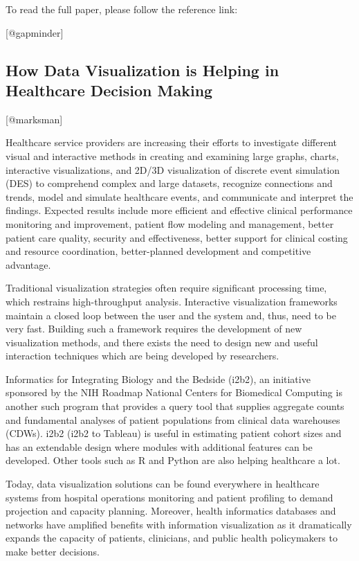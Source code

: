 \documentclass[]{book}
\theoremstyle{definition}
\theoremstyle{definition}
\theoremstyle{definition}
\theoremstyle{remark}
\begin{document}
To read the full paper, please follow the reference link:

{[}@gapminder{]}

\subsection{How Data Visualization is Helping in Healthcare Decision
Making}\label{how-data-visualization-is-helping-in-healthcare-decision-making}

{[}@marksman{]}

Healthcare service providers are increasing their efforts to investigate
different visual and interactive methods in creating and examining large
graphs, charts, interactive visualizations, and 2D/3D visualization of
discrete event simulation (DES) to comprehend complex and large
datasets, recognize connections and trends, model and simulate
healthcare events, and communicate and interpret the findings. Expected
results include more efficient and effective clinical performance
monitoring and improvement, patient flow modeling and management, better
patient care quality, security and effectiveness, better support for
clinical costing and resource coordination, better-planned development
and competitive advantage.

Traditional visualization strategies often require significant
processing time, which restrains high-throughput analysis. Interactive
visualization frameworks maintain a closed loop between the user and the
system and, thus, need to be very fast. Building such a framework
requires the development of new visualization methods, and there exists
the need to design new and useful interaction techniques which are being
developed by researchers.

Informatics for Integrating Biology and the Bedside (i2b2), an
initiative sponsored by the NIH Roadmap National Centers for Biomedical
Computing is another such program that provides a query tool that
supplies aggregate counts and fundamental analyses of patient
populations from clinical data warehouses (CDWs). i2b2 (i2b2 to Tableau)
is useful in estimating patient cohort sizes and has an extendable
design where modules with additional features can be developed. Other
tools such as R and Python are also helping healthcare a lot.

Today, data visualization solutions can be found everywhere in
healthcare systems from hospital operations monitoring and patient
profiling to demand projection and capacity planning. Moreover, health
informatics databases and networks have amplified benefits with
information visualization as it dramatically expands the capacity of
patients, clinicians, and public health policymakers to make better
decisions.
\end{document}
